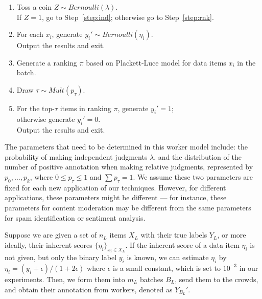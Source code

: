 \begin{enumerate}
  \item \label{step:tosscoin}
        Toss a coin $Z \sim Bernoulli(\lambda)$.  \\
        If $Z=1$, go to Step~\ref{step:ind};
        otherwise go to Step~\ref{step:rnk}.
  \item \label{step:ind}
        For each $x_i$, generate $y_i' \sim Bernoulli(\eta_i)$. \\
        Output the results and exit.
  \item \label{step:rnk}
        Generate a ranking $\pi$ based on Plackett-Luce model for data items $x_i$ in the batch.
  \item \label{step:draw}
        Draw $\tau \sim Mult(p_{\tau})$.
  \item \label{step:annotate}
        For the top-$\tau$ items in ranking $\pi$, generate $y_i' = 1$; \\
        otherwise generate $y_i' = 0$.  \\
        Output the results and exit.
\end{enumerate}



The parameters that need to be determined in this worker model include:
the probability of making independent judgments $\lambda$,
and the distribution of the number of positive annotation when making relative judgments,
represented by $p_0, \ldots, p_k$, where $0 \leq p_{\tau} \leq 1$ and $\sum p_{\tau} = 1$.
We assume these two parameters are fixed for each new application of our techniques.  
However, for different applications, these parameters might be different --- for instance, 
these parameters for content moderation may be different from the same parameters for spam identification or sentiment analysis.  




Suppose we are given a set of $n_L$ items $X_L$ with their true labels $Y_L$, 
or more ideally, their inherent scores $\{\eta_i\}_{x_i \in X_L}$.  
If the inherent score of a data item $\eta_i$ is not given, 
but only the binary label $y_i$ is known,
we can estimate $\eta_i$ by $\eta_i = (y_i + \epsilon)/(1 + 2 \epsilon)$ 
where $\epsilon$ is a small constant, which is set to $10^{-3}$ in our experiments.
Then, we form them into $m_L$ batches $B_L$, send them to the crowds,
and obtain their annotation from workers, denoted as $Y_{B_L}'$.



